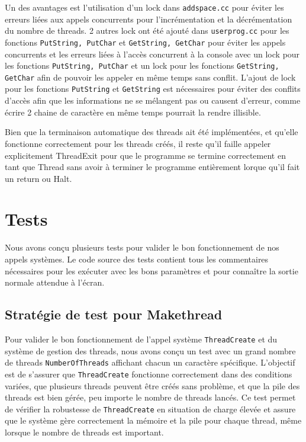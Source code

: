 \documentclass[a4paper,11pt]{article}
\begin{document}
 Un des avantages est l'utilisation d'un lock dans \texttt{addspace.cc} pour éviter les erreurs liées aux appels concurrents pour l'incrémentation et la décrémentation du nombre de threads.
2 autres lock ont été ajouté dans \texttt{userprog.cc} pour les fonctions \texttt{PutString, PutChar} et \texttt{GetString, GetChar} pour éviter les appels concurrents et les erreurs liées à l'accès concurrent à la console avec un lock pour les fonctions \texttt{PutString, PutChar} et un lock pour les fonctions \texttt{GetString, GetChar} afin de pouvoir les appeler en même temps sans conflit.
L'ajout de lock pour les fonctions \texttt{PutString} et \texttt{GetString} est nécessaires pour éviter des conflits d'accès afin que les informations ne se mélangent pas ou causent d'erreur, comme écrire 2 chaine de caractère en même temps pourrait la rendre illisible.

Bien que la terminaison automatique des threads ait été implémentées, et qu'elle fonctionne correctement pour les threads créés, il reste qu'il faille appeler explicitement ThreadExit pour que le programme se termine correctement en tant que Thread sans avoir à terminer le programme entièrement lorque qu'il fait un return ou Halt.

\section{Tests}

Nous avons conçu plusieurs tests pour valider le bon fonctionnement de nos appels systèmes.
Le code source des tests contient tous les commentaires nécessaires pour les exécuter avec les bons paramètres et pour connaître la sortie normale attendue à l'écran.

\subsection{Stratégie de test pour Makethread}

Pour valider le bon fonctionnement de l'appel système \texttt{ThreadCreate} et du système de gestion des threads, nous avons conçu un test avec un grand nombre de threads \texttt{NumberOfThreads} affichant chacun un caractère spécifique. L'objectif est de s'assurer que \texttt{ThreadCreate} fonctionne correctement dans des conditions variées, que plusieurs threads peuvent être créés sans problème, et que la pile des threads est bien gérée, peu importe le nombre de threads lancés.
Ce test permet de vérifier la robustesse de \texttt{ThreadCreate} en situation de charge élevée et assure que le système gère correctement la mémoire et la pile pour chaque thread, même lorsque le nombre de threads est important.
\end{document}
